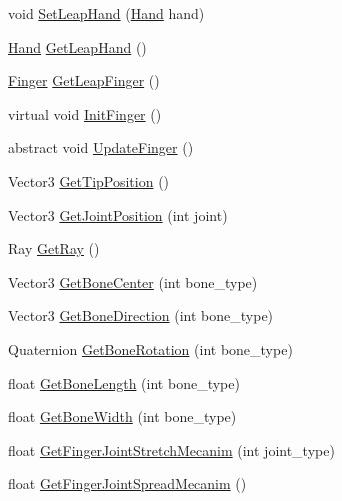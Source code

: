\begin{DoxyCompactItemize}
\item 
void \mbox{\hyperlink{class_leap_1_1_unity_1_1_finger_model_a5f8a0bc34c12092d53249cbdb2e19b75}{Set\+Leap\+Hand}} (\mbox{\hyperlink{class_leap_1_1_hand}{Hand}} hand)
\item 
\mbox{\hyperlink{class_leap_1_1_hand}{Hand}} \mbox{\hyperlink{class_leap_1_1_unity_1_1_finger_model_a4247dfc727b2b1d05c16a81c440ed22d}{Get\+Leap\+Hand}} ()
\item 
\mbox{\hyperlink{class_leap_1_1_finger}{Finger}} \mbox{\hyperlink{class_leap_1_1_unity_1_1_finger_model_a053d0477db4bbb6c3353350b769089b3}{Get\+Leap\+Finger}} ()
\item 
virtual void \mbox{\hyperlink{class_leap_1_1_unity_1_1_finger_model_a27b24f96e9e709625779cc24bd5d72f3}{Init\+Finger}} ()
\item 
abstract void \mbox{\hyperlink{class_leap_1_1_unity_1_1_finger_model_a9103f063172a8f99a9aa083407ada2a2}{Update\+Finger}} ()
\item 
Vector3 \mbox{\hyperlink{class_leap_1_1_unity_1_1_finger_model_a16b8b56d0d1d8f2876fede7df4914143}{Get\+Tip\+Position}} ()
\item 
Vector3 \mbox{\hyperlink{class_leap_1_1_unity_1_1_finger_model_acc14a2149a5a1c8d7277f64db41af544}{Get\+Joint\+Position}} (int joint)
\item 
Ray \mbox{\hyperlink{class_leap_1_1_unity_1_1_finger_model_a88e07c014c2ac4cfa7403760bc1d2dd7}{Get\+Ray}} ()
\item 
Vector3 \mbox{\hyperlink{class_leap_1_1_unity_1_1_finger_model_a660b8448f1f9f6ea0b5ffe773b110925}{Get\+Bone\+Center}} (int bone\+\_\+type)
\item 
Vector3 \mbox{\hyperlink{class_leap_1_1_unity_1_1_finger_model_a66f77c83bb90b02c1b46692d5f824ae3}{Get\+Bone\+Direction}} (int bone\+\_\+type)
\item 
Quaternion \mbox{\hyperlink{class_leap_1_1_unity_1_1_finger_model_a1d84c11cb9e8a1096225718bcd759ceb}{Get\+Bone\+Rotation}} (int bone\+\_\+type)
\item 
float \mbox{\hyperlink{class_leap_1_1_unity_1_1_finger_model_acd58685c52b4bf4dc85e19597dc4de56}{Get\+Bone\+Length}} (int bone\+\_\+type)
\item 
float \mbox{\hyperlink{class_leap_1_1_unity_1_1_finger_model_ae6f5843758fb9c6e1f08affba6b4be72}{Get\+Bone\+Width}} (int bone\+\_\+type)
\item 
float \mbox{\hyperlink{class_leap_1_1_unity_1_1_finger_model_a054cf50d19d911d50ddae0b0dcc40026}{Get\+Finger\+Joint\+Stretch\+Mecanim}} (int joint\+\_\+type)
\item 
float \mbox{\hyperlink{class_leap_1_1_unity_1_1_finger_model_a6abf370a3ddeb4675801eeec6378a375}{Get\+Finger\+Joint\+Spread\+Mecanim}} ()
\end{DoxyCompactItemize}

